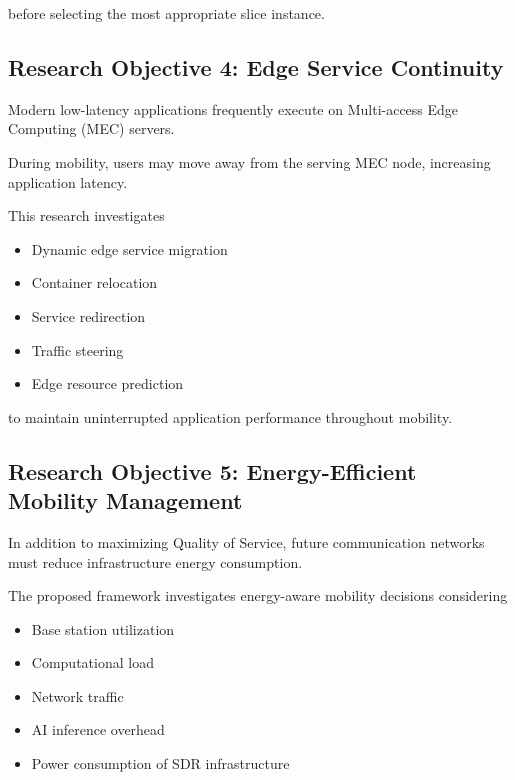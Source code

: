 \documentclass[12pt,a4paper]{article}\usepackage[a4paper,margin=1in]{geometry}\usepackage{graphicx}\usepackage{longtable}\usepackage{booktabs}\usepackage{hyperref}\usepackage{enumitem}\usepackage{amsmath}\usepackage{tikz}\usepackage{pgfgantt}\usepackage{setspace}\setstretch{1.15}\usetikzlibrary{positioning,arrows.meta,shapes.geometric}
\begin{document}
	before selecting the most appropriate slice instance.
	
	
	\subsection{Research Objective 4: Edge Service Continuity}
	
	Modern low-latency applications frequently execute on Multi-access Edge Computing (MEC) servers.
	
	During mobility, users may move away from the serving MEC node, increasing application latency.
	
	This research investigates
	
	\begin{itemize}
		
		\item Dynamic edge service migration
		
		\item Container relocation
		
		\item Service redirection
		
		\item Traffic steering
		
		\item Edge resource prediction
		
	\end{itemize}
	
	to maintain uninterrupted application performance throughout mobility.
	
	
	\subsection{Research Objective 5: Energy-Efficient Mobility Management}
	
	In addition to maximizing Quality of Service, future communication networks must reduce infrastructure energy consumption.
	
	The proposed framework investigates energy-aware mobility decisions considering
	
	\begin{itemize}
		
		\item Base station utilization
		
		\item Computational load
		
		\item Network traffic
		
		\item AI inference overhead
		
		\item Power consumption of SDR infrastructure
		
	\end{itemize}
	
\end{document}
